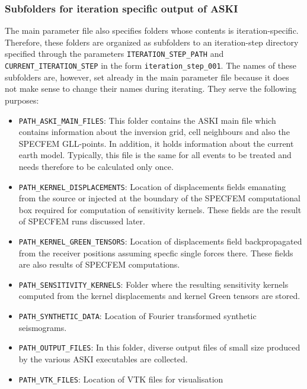 \subsubsection{Subfolders for iteration specific output of ASKI}
%
The main parameter file also specifies folders whose contents is iteration-specific. Therefore, these folders are organized as subfolders to an iteration-step directory specified through the parameters \verb+ITERATION_STEP_PATH+ and \verb+CURRENT_ITERATION_STEP+ in the form \verb+iteration_step_001+. The names of these subfolders are, however, set already in the main parameter file because it does not make sense to change their names during iterating. They serve the following purposes:
\begin{itemize}
	\setlength{\itemsep}{-0.1cm}
  \item \verb+PATH_ASKI_MAIN_FILES+: This folder contains the ASKI main file which contains information about the inversion grid, cell neighbours and also the SPECFEM GLL-points. In addition, it holds information about the current earth model. Typically, this file is the same for all events to be treated and needs therefore to be calculated only once.
  \item \verb+PATH_KERNEL_DISPLACEMENTS+: Location of displacements fields emanating from the source or injected at the boundary of the SPECFEM computational box required for computation of sensitivity kernels. These fields are the result of SPECFEM runs discussed later.
  \item \verb+PATH_KERNEL_GREEN_TENSORS+: Location of displacements field backpropagated from the receiver positions assuming specfic single forces there. These fields are also results of SPECFEM computations.
  \item \verb+PATH_SENSITIVITY_KERNELS+: Folder where the resulting sensitivity kernels computed from the kernel displacements and kernel Green tensors are stored.
  \item \verb+PATH_SYNTHETIC_DATA+: Location of Fourier transformed synthetic seismograms.
  \item \verb+PATH_OUTPUT_FILES+: In this folder, diverse output files of small size produced by the various ASKI executables are collected.
  \item \verb+PATH_VTK_FILES+: Location of VTK files for visualisation
\end{itemize}
%
